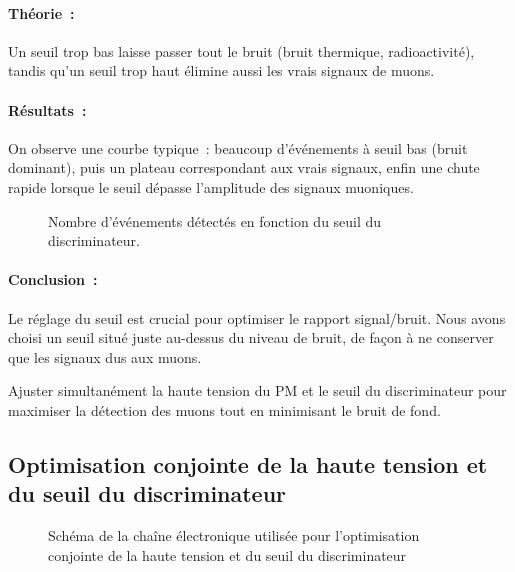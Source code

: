 \documentclass[a4paper,12pt,twoside]{article}
\begin{document}
\paragraph{Théorie :} Un seuil trop bas laisse passer tout le bruit (bruit thermique, radioactivité), tandis qu’un seuil trop haut élimine aussi les vrais signaux de muons.

\paragraph{Résultats :} On observe une courbe typique : beaucoup d’événements à seuil bas (bruit dominant), puis un plateau correspondant aux vrais signaux, enfin une chute rapide lorsque le seuil dépasse l’amplitude des signaux muoniques.

\begin{figure}[H]
    \centering
    \caption{Nombre d’événements détectés en fonction du seuil du discriminateur.}
\end{figure}

\paragraph{Conclusion :} Le réglage du seuil est crucial pour optimiser le rapport signal/bruit. Nous avons choisi un seuil situé juste au-dessus du niveau de bruit, de façon à ne conserver que les signaux dus aux muons.


\vspace{1em}
\begin{center}
\begin{tcolorbox}[colback=blue!5!white, colframe=blue!60!black, title=Principe de l’optimisation des réglages électroniques]
Ajuster simultanément la haute tension du PM et le seuil du discriminateur pour maximiser la détection des muons tout en minimisant le bruit de fond.
\end{tcolorbox}
\end{center}


\subsection{Optimisation conjointe de la haute tension et du seuil du discriminateur}

\begin{figure}[H]
  \centering
  
  \caption{Schéma de la chaîne électronique utilisée pour l'optimisation conjointe de la haute tension et du seuil du discriminateur}
  \label{fig:optimisation_HT_seuil}
\end{figure}
\end{document}
